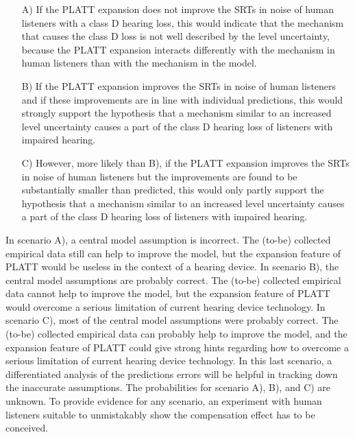 \documentclass[10pt,a4paper,twocolumn]{article}
\begin{document}
\begin{itemize}
	\item[A)] If the PLATT expansion does not improve the SRTs in noise of human listeners with a class D hearing loss, this would indicate that the mechanism that causes the class D loss is not well described by the level uncertainty, because the PLATT expansion interacts differently with the mechanism in human listeners than with the mechanism in the model.
	\item[B)] If the PLATT expansion improves the SRTs in noise of human listeners and if these improvements are in line with individual predictions, this would strongly support the hypothesis that a mechanism similar to an increased level uncertainty causes a part of the class D hearing loss of listeners with impaired hearing.
	\item[C)] However, more likely than B), if the PLATT expansion improves the SRTs in noise of human listeners but the improvements are found to be substantially smaller than predicted, this would only partly support the hypothesis that a mechanism similar to an increased level uncertainty causes a part of the class D hearing loss of listeners with impaired hearing.
\end{itemize}
%
In scenario A), a central model assumption is incorrect.
%
The (to-be) collected empirical data still can help to improve the model, but the expansion feature of PLATT would be useless in the context of a hearing device.
%
In scenario B), the central model assumptions are probably correct.
%
The (to-be) collected empirical data cannot help to improve the model, but the expansion feature of PLATT would overcome a serious limitation of current hearing device technology.
%
In scenario C), most of the central model assumptions were probably correct.
%
The (to-be) collected empirical data can probably help to improve the model, and the expansion feature of PLATT could give strong hints regarding how to overcome a serious limitation of current hearing device technology.
%
In this last scenario, a differentiated analysis of the predictions errors will be helpful in tracking down the inaccurate assumptions.
%
The probabilities for scenario A), B), and C) are unknown.
%
To provide evidence for any scenario, an experiment with human listeners suitable to unmistakably show the compensation effect has to be conceived.
\end{document}
